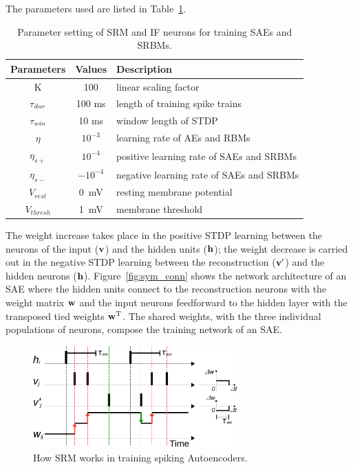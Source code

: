 The parameters used are listed in \protect{} Table~\ref{tbl:srm}.
\begin{table}[th]
	\centering
	\caption{\label{tbl:srm}Parameter setting of SRM and IF neurons for training SAEs and SRBMs.}
	\bgroup
	\def\arraystretch{1.2}
	\begin{tabular}{c c l}
		Parameters & Values & Description \\
		\hline
		K & 100 & linear scaling factor\\
		
		$\tau_{\textit{\textrm{dur}}}$ & 100 ms &  length of training spike trains\\
		
		$\tau_{\textit{\textrm{win}}}$ & 10 ms & window length of STDP\\
		$\eta$ & $10^{-3}$ & learning rate of AEs and RBMs\\
		$\eta_{s+}$ & $10^{-4}$ & positive learning rate of SAEs and SRBMs\\
		$\eta_{s-}$ & $-10^{-4}$ & negative learning rate of SAEs and SRBMs\\
		$V_{rest}$ & 0~mV & resting membrane potential\\
		$V_{thresh}$ & 1~mV & membrane threshold  \\
	\end{tabular}
	\egroup
\end{table}


The weight increase takes place in the positive STDP learning between the neurons of the input ($\bf{v}$) and the hidden units ($\bf{h}$); 
the weight decrease is carried out in the negative STDP learning between the reconstruction ($\bf{v'}$) and the hidden neurons ($\bf{h}$).
Figure~\ref{fig:sym_conn} shows the network architecture of an SAE where the hidden units connect to the reconstruction neurons with the weight matrix $\bf{w}$ and the input neurons feedforward to the hidden layer with the transposed tied weights $\bf{w}^\textrm{T}$.
The shared weights, with the three individual populations of  neurons, compose the training network of an SAE.

\begin{figure}[th]
	\centering
	\includegraphics[width=0.7\textwidth]{pics_sdlm/rSTDP.pdf}
	\caption{How SRM works in training spiking Autoencoders.}
	\label{fig:rSTDP}
\end{figure}

